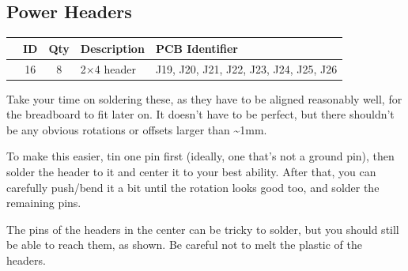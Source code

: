 \documentclass[12pt, a4paper]{article}
\newcommand{\checkbox}[1]{\CheckBox[backgroundcolor=0.86 0.828 0.71, name=#1]{}}
\begin{document}
\pagebreak

\subsection{Power Headers}

\begin{center}
    \small
    \setlength\extrarowheight{8pt}
    \begin{tabularx}{\textwidth}{|c|c|c|X|l|}
        \hline\rowcolor{lightgray} & ID & Qty & Description & PCB Identifier\\
        \hline\checkbox{fa} & 16 & 8 & 2×4 header & J19, J20, J21, J22, J23, J24, J25, J26\\
        \hline
    \end{tabularx}
\end{center}

Take your time on soldering these, as they have to be aligned reasonably well, for the
breadboard to fit later on. It doesn't have to be perfect, but there shouldn't be any obvious
rotations or offsets larger than \textasciitilde1mm.

To make this easier, tin one pin first (ideally, one that's not a ground pin), then solder the
header to it and center it to your best ability. After that, you can carefully push/bend it a
bit until the rotation looks good too, and solder the remaining pins.

The pins of the headers in the center can be tricky to solder, but you should still be able to
reach them, as shown. Be careful not to melt the plastic of the headers.
\end{document}

